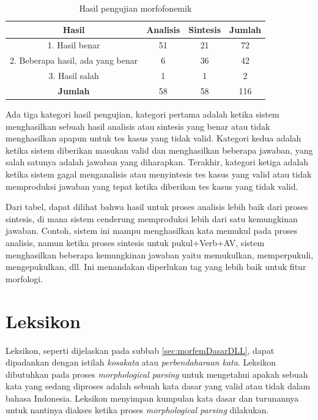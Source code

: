 \begin{table}[H]
\centering
\begin{tabular}{|c|c|c|c|}
\hline
\textbf{Hasil} & \textbf{Analisis} & \textbf{Sintesis} & \textbf{Jumlah} \\
\hline
1. Hasil benar & 51 & 21 & 72 \\
\hline
2. Beberapa hasil, ada yang benar & 6 & 36 & 42 \\
\hline
3. Hasil salah & 1 & 1 & 2 \\
\hline
\textbf{Jumlah} & 58 & 58 & 116 \\
\hline
\end{tabular}
\caption{Hasil pengujian morfofonemik\cite{manurung:08:indonesian}}
\label{tabel-hasil-pengujian-morfofonemik}
\end{table}

Ada tiga kategori hasil pengujian, kategori pertama adalah ketika sistem menghasilkan sebuah hasil analisis atau sintesis yang benar atau tidak menghasilkan apapun untuk tes kasus yang tidak valid. Kategori kedua adalah ketika sistem diberikan masukan valid dan menghasilkan beberapa jawaban, yang salah satunya adalah jawaban yang diharapkan. Terakhir, kategori ketiga adalah ketika sistem gagal menganalisis atau menyintesis tes kasus yang valid atau tidak memproduksi jawaban yang tepat ketika diberikan tes kasus yang tidak valid.

Dari tabel, dapat dilihat bahwa hasil untuk proses analisis lebih baik dari proses sintesis, di mana sistem cenderung memproduksi lebih dari satu kemungkinan jawaban. Contoh, sistem ini mampu menghasilkan kata memukul pada proses analisis, namun ketika proses sintesis untuk pukul+Verb+AV, sistem menghasilkan beberapa kemungkinan jawaban yaitu memukulkan, memperpukuli, mengepukulkan, dll. Ini menandakan diperlukan tag yang lebih baik untuk fitur morfologi.

\section{Leksikon}
\label{sec:leksikon}
Leksikon, seperti dijelaskan pada subbab \ref{sec:morfemDasarDLL}, dapat dipadankan dengan istilah \textit{kosakata} atau \textit{perbendaharaan kata}. Leksikon dibutuhkan pada proses \textit{morphological parsing} untuk mengetahui apakah sebuah kata yang sedang diproses adalah sebuah kata dasar yang valid atau tidak dalam bahasa Indonesia. Leksikon menyimpan kumpulan kata dasar dan turunannya untuk nantinya diakses ketika proses \textit{morphological parsing} dilakukan.

